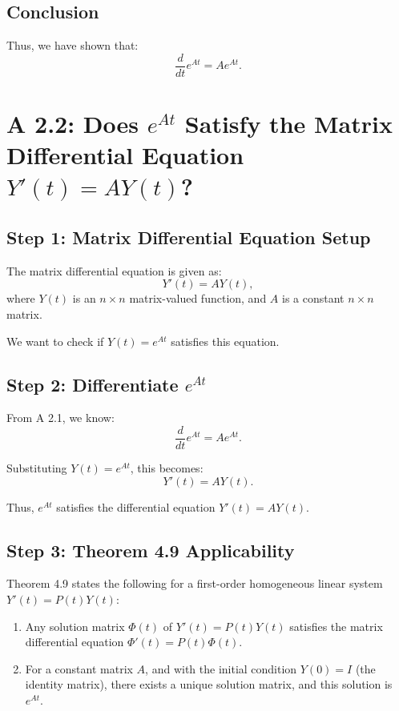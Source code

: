 \documentclass[12pt]{article}
\begin{document}
\subsection*{Conclusion}

Thus, we have shown that:
\[
\frac{d}{dt} e^{At} = A e^{At}.
\]

\section*{A 2.2: Does \(e^{At}\) Satisfy the Matrix Differential Equation \(Y'(t) = AY(t)\)?}

\subsection*{Step 1: Matrix Differential Equation Setup}

The matrix differential equation is given as:
\[
Y'(t) = A Y(t),
\]
where \(Y(t)\) is an \(n \times n\) matrix-valued function, and \(A\) is a constant \(n \times n\) matrix.

We want to check if \(Y(t) = e^{At}\) satisfies this equation.

\subsection*{Step 2: Differentiate \(e^{At}\)}

From A 2.1, we know:
\[
\frac{d}{dt} e^{At} = A e^{At}.
\]

Substituting \(Y(t) = e^{At}\), this becomes:
\[
Y'(t) = A Y(t).
\]

Thus, \(e^{At}\) satisfies the differential equation \(Y'(t) = A Y(t)\).

\subsection*{Step 3: Theorem 4.9 Applicability}

Theorem 4.9 states the following for a first-order homogeneous linear system \(Y'(t) = P(t)Y(t)\):
\begin{enumerate}
    \item Any solution matrix \( \Phi(t) \) of \( Y'(t) = P(t)Y(t) \) satisfies the matrix differential equation \(\Phi'(t) = P(t)\Phi(t)\).
    \item For a constant matrix \(A\), and with the initial condition \(Y(0) = I\) (the identity matrix), there exists a unique solution matrix, and this solution is \(e^{At}\).
\end{enumerate}
\end{document}
